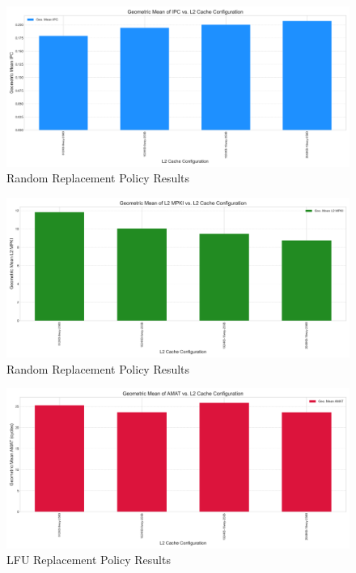 \documentclass{article}
\begin{document}
\begin{figure}[H]
    \centering
    \includegraphics[width=\textwidth]{figures/random/ipc_random.png}
    \caption{Random Replacement Policy Results}
    \label{fig:random_ipc}
\end{figure}

\begin{figure}[H]
    \centering
    \includegraphics[width=\textwidth]{figures/random/mpki_random.png}
    \caption{Random Replacement Policy Results}
    \label{fig:random_mpki}
\end{figure}

\begin{figure}[H]
    \centering
    \includegraphics[width=\textwidth]{figures/lfu/amat_lfu.png}
    \caption{LFU Replacement Policy Results}
    \label{fig:lfu_amat}
\end{figure}
\end{document}
